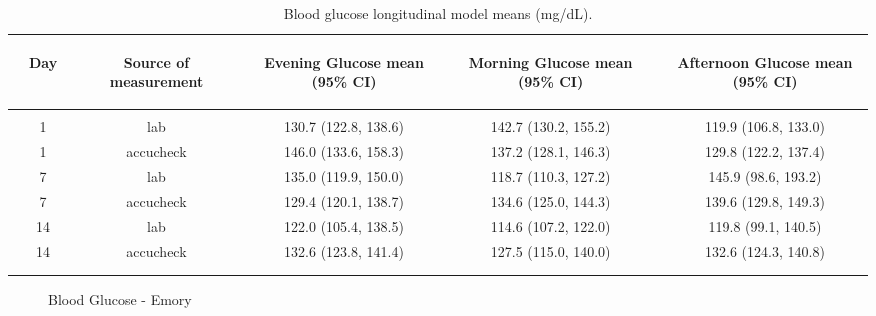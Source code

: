 \documentclass[dvips,10pt]{article}
\begin{document}
\begin{table}[t]
\caption
{ Blood glucose longitudinal model means (mg/dL). }
\begin{center}
\begin{tabular}{ @{}l@{}
@{}c@{}@{}p{1.5em}@{}@{}c@{}@{}p{1.5em}@{}@{}c@{}@{}p{1.5em}@{}@{}c@{}@{}p{1.5em}@{}@{}c@{}
}
\hline

& \parbox{6em}{\begin{center}Day\end{center}} && \parbox{6em}{\begin{center}Source of measurement\end{center}} && \parbox{6em}{\begin{center}Evening Glucose mean (95\% CI)\end{center}} && \parbox{6em}{\begin{center}Morning Glucose mean (95\% CI)\end{center}} && \parbox{6em}{\begin{center}Afternoon Glucose mean (95\% CI)\end{center}} \\

\hline

\\
& 1 && lab && 130.7 (122.8, 138.6) && 142.7 (130.2, 155.2) && 119.9 (106.8, 133.0) \\
& 1 && accucheck && 146.0 (133.6, 158.3) && 137.2 (128.1, 146.3) && 129.8 (122.2, 137.4) \\
& 7 && lab && 135.0 (119.9, 150.0) && 118.7 (110.3, 127.2) && 145.9 (98.6, 193.2) \\
& 7 && accucheck && 129.4 (120.1, 138.7) && 134.6 (125.0, 144.3) && 139.6 (129.8, 149.3) \\
& 14 && lab && 122.0 (105.4, 138.5) && 114.6 (107.2, 122.0) && 119.8 (99.1, 140.5) \\
& 14 && accucheck && 132.6 (123.8, 141.4) && 127.5 (115.0, 140.0) && 132.6 (124.3, 140.8) \\
\\
\hline \\

\end{tabular}

\end{center}
 \end{table}
\clearpage

\begin{figure}
\caption{Blood Glucose - Emory}
\end{figure}
\clearpage
\end{document}
